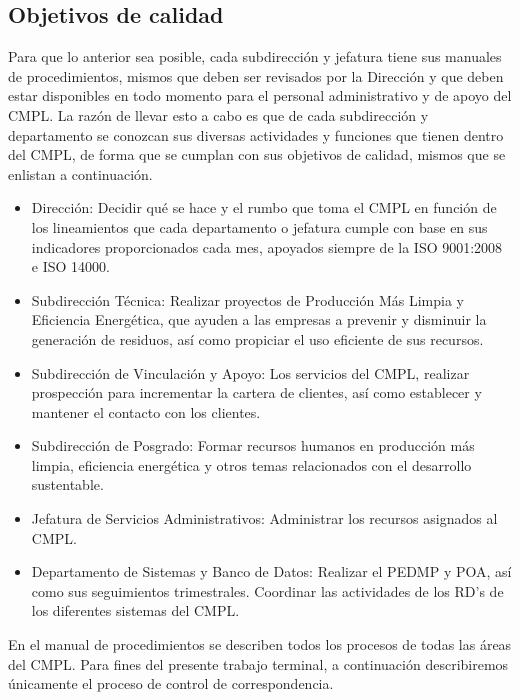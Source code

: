 	\subsection{Objetivos de calidad}
	Para que lo anterior sea posible, cada subdirección y jefatura tiene sus manuales de procedimientos, mismos que deben ser revisados por la Dirección y que deben estar disponibles en todo momento para el personal administrativo y de apoyo del CMPL. La razón de llevar esto a cabo es que de cada subdirección y departamento se conozcan sus diversas actividades y funciones que tienen dentro del CMPL, de forma que se cumplan con sus objetivos de calidad, mismos que se enlistan a continuación.\\
	
	\begin{itemize}
		\item Dirección: Decidir qué se hace y el rumbo que toma el CMPL en función de los lineamientos que cada departamento o jefatura cumple con base en sus indicadores proporcionados cada mes, apoyados siempre de la ISO 9001:2008 e ISO 14000.
		\item Subdirección Técnica: Realizar proyectos de Producción Más Limpia y Eficiencia Energética, que  ayuden a las empresas a prevenir y disminuir la generación de residuos, así como propiciar el uso eficiente de sus recursos. \cite{SIGTecnica}
		\item Subdirección de Vinculación y Apoyo: Los servicios del CMPL, realizar prospección para incrementar la cartera de clientes, así como establecer y mantener el contacto con los clientes. \cite{SIGVinculacion}
		\item Subdirección de Posgrado: Formar recursos humanos en producción más limpia, eficiencia energética y otros temas relacionados con el desarrollo sustentable. \cite{SIGPosgrado}
		\item Jefatura de Servicios Administrativos: Administrar los recursos asignados al CMPL. \cite{SIGAdministrativa}
		\item Departamento de Sistemas y Banco de Datos: Realizar el PEDMP y POA, así como sus seguimientos trimestrales. Coordinar las actividades de los RD's de los diferentes sistemas del CMPL. \cite{SIGSistemas}
	\end{itemize}
	
	En el manual de procedimientos se describen todos los procesos de todas las áreas del CMPL. Para fines del presente trabajo terminal, a continuación describiremos únicamente el proceso de control de correspondencia.
	

